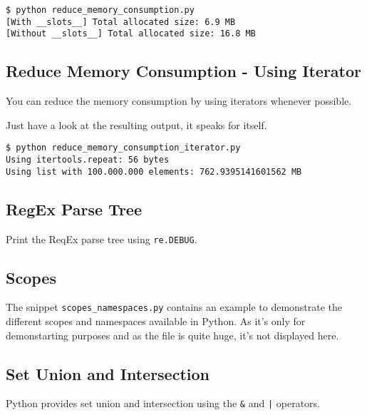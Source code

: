 \begin{lstlisting}[caption=Output of reduce\_memory\_consumption.py]
$ python reduce_memory_consumption.py
[With __slots__] Total allocated size: 6.9 MB
[Without __slots__] Total allocated size: 16.8 MB
\end{lstlisting}


\subsection{Reduce Memory Consumption - Using Iterator}

You can reduce the memory consumption by using iterators whenever possible.



Just have a look at the resulting output, it speaks for itself.

\begin{lstlisting}[caption=Output of reduce\_memory\_consumption\_iterator.py]
$ python reduce_memory_consumption_iterator.py
Using itertools.repeat: 56 bytes
Using list with 100.000.000 elements: 762.9395141601562 MB
\end{lstlisting}


\subsection{RegEx Parse Tree}

Print the ReqEx parse tree using \lstinline{re.DEBUG}.




\subsection{Scopes}

The snippet \lstinline{scopes_namespaces.py} contains an example to demonstrate the different scopes and namespaces available in Python.
As it's only for demonstarting purposes and as the file is quite huge, it's not displayed here.


\subsection{Set Union and Intersection}

Python provides set union and intersection using the \lstinline{&} and \lstinline{|} operators.

